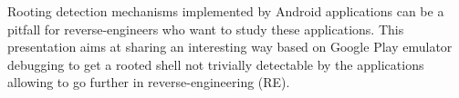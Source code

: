\def\abstracttitle{Android\_Emuroot: Abusing Google Play Emulator Debugging to RE Non-Cooperative Apps as Root}
\def\abstractcomment{Short Talk}
\def\abstractowner{anais}

\thispagestyle{abstract}

Rooting detection mechanisms implemented by Android applications can be a pitfall for reverse-engineers who want to study these applications. This presentation aims at sharing an interesting way based on Google Play emulator debugging to get a rooted shell not trivially detectable by the applications allowing to go further in reverse-engineering (RE).
